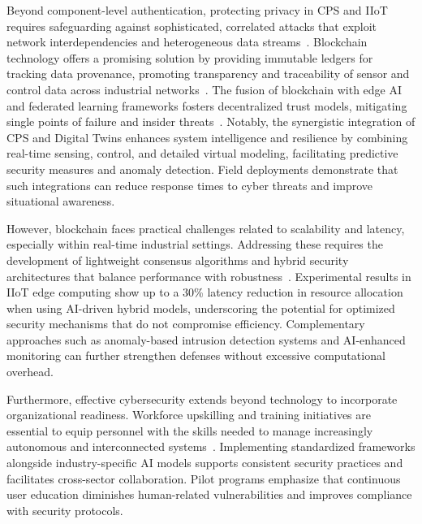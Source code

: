 \documentclass[sigconf]{acmart}
\begin{document}
Beyond component-level authentication, protecting privacy in CPS and IIoT requires safeguarding against sophisticated, correlated attacks that exploit network interdependencies and heterogeneous data streams~\cite{ref15}. Blockchain technology offers a promising solution by providing immutable ledgers for tracking data provenance, promoting transparency and traceability of sensor and control data across industrial networks~\cite{ref20}. The fusion of blockchain with edge AI and federated learning frameworks fosters decentralized trust models, mitigating single points of failure and insider threats~\cite{ref22}. Notably, the synergistic integration of CPS and Digital Twins enhances system intelligence and resilience by combining real-time sensing, control, and detailed virtual modeling, facilitating predictive security measures and anomaly detection. Field deployments demonstrate that such integrations can reduce response times to cyber threats and improve situational awareness.

However, blockchain faces practical challenges related to scalability and latency, especially within real-time industrial settings. Addressing these requires the development of lightweight consensus algorithms and hybrid security architectures that balance performance with robustness~\cite{ref31}. Experimental results in IIoT edge computing show up to a 30\% latency reduction in resource allocation when using AI-driven hybrid models, underscoring the potential for optimized security mechanisms that do not compromise efficiency. Complementary approaches such as anomaly-based intrusion detection systems and AI-enhanced monitoring can further strengthen defenses without excessive computational overhead. 

Furthermore, effective cybersecurity extends beyond technology to incorporate organizational readiness. Workforce upskilling and training initiatives are essential to equip personnel with the skills needed to manage increasingly autonomous and interconnected systems~\cite{ref32}. Implementing standardized frameworks alongside industry-specific AI models supports consistent security practices and facilitates cross-sector collaboration. Pilot programs emphasize that continuous user education diminishes human-related vulnerabilities and improves compliance with security protocols.
\end{document}
